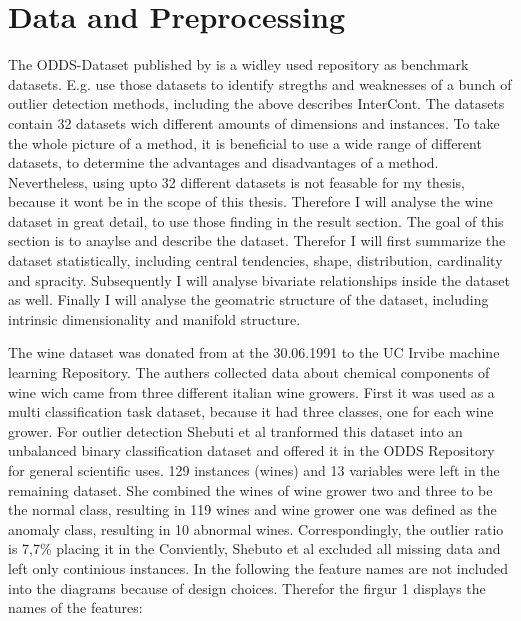 \section{Data and Preprocessing}
The ODDS-Dataset published by \citet{Rayana:2016} is a widley used repository as benchmark datasets.
E.g. \citet{shenkar2022anomaly} use those datasets to identify stregths and weaknesses of a bunch of outlier detection methods, including the above describes InterCont.
The datasets contain 32 datasets wich different amounts of dimensions and instances. 
To take the whole picture of a method, it is beneficial to use a wide range of different datasets, to determine the advantages and disadvantages of a method.
Nevertheless, using upto 32 different datasets is not feasable for my thesis, because it wont be in the scope of this thesis.
Therefore I will analyse the wine dataset in great detail, to use those finding in the result section.
The goal of this section is to anaylse and describe the dataset.
Therefor I will first summarize the dataset statistically, including central tendencies, shape, distribution, cardinality and spracity.
Subsequently I will analyse bivariate relationships inside the dataset as well.
Finally I will analyse the geomatric structure of the dataset, including intrinsic dimensionality and manifold structure.


The wine dataset was donated from \citet{wine_109} at the 30.06.1991 to the UC Irvibe machine learning Repository.
The authers collected data about chemical components of wine wich came from three different italian wine growers. 
First it was used as a multi classification task dataset, because it had three classes, one for each wine grower.
For outlier detection Shebuti et al tranformed this dataset into an unbalanced binary classification dataset and offered it in the ODDS Repository for general scientific uses. 
129 instances (wines) and 13 variables were left in the remaining dataset.
She combined the wines of wine grower two and three to be the normal class, resulting in 119 wines and wine grower one was defined as the anomaly class, resulting in 10 abnormal wines.
Correspondingly, the outlier ratio is 7,7\% placing it in the 
Conviently, Shebuto et al excluded all missing data and left only continious instances.
In the following the feature names are not included into the diagrams because of design choices.
Therefor the firgur 1 displays the names of the features: 


